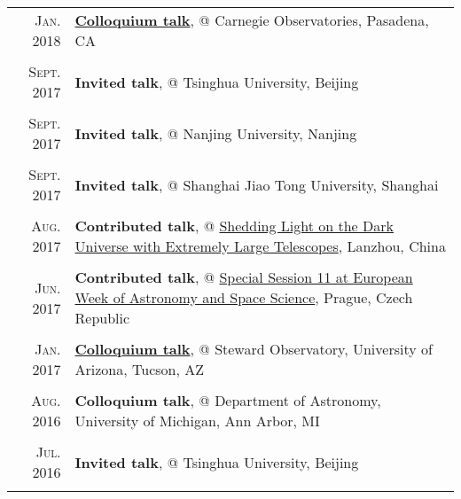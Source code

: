 \documentclass[letterpaper,10pt]{article}
\newcommand{\textwrap}{5.8in}       %
\begin{document}
\begin{longtable}{r|p{\textwrap}}
    \textsc{Jan. 2018}   &   \href{http://obs.carnegiescience.edu/talk_event/828}{\textbf{Colloquium talk}}, @ Carnegie Observatories, Pasadena, CA \\
    \multicolumn{2}{c}{} \\

    \textsc{Sept. 2017}   &   \textbf{Invited talk}, @ Tsinghua University, Beijing \\
    \multicolumn{2}{c}{} \\

    \textsc{Sept. 2017}   &   \textbf{Invited talk}, @ Nanjing University, Nanjing \\
    \multicolumn{2}{c}{} \\

    \textsc{Sept. 2017}   &   \textbf{Invited talk}, @ Shanghai Jiao Tong University, Shanghai \\
    \multicolumn{2}{c}{} \\

    \textsc{Aug. 2017}   &   \textbf{Contributed talk}, @
    \href{http://darkuniverse2017.csp.escience.cn/dct/page/65580}{Shedding Light on
    the Dark Universe with Extremely Large Telescopes}, Lanzhou, China      \\
    \multicolumn{2}{c}{} \\

    \textsc{Jun. 2017}   &   \textbf{Contributed talk}, @
    \href{http://eas.unige.ch/EWASS2017/session.jsp?id=SS11}{Special Session 11 at
    European Week of Astronomy and Space Science}, Prague, Czech Republic   \\
    \multicolumn{2}{c}{} \\

    \textsc{Jan. 2017}   &   \href{http://mingus.as.arizona.edu/~bjw/galaxy_group/2017spring.html}{\textbf{Colloquium talk}}, @ Steward Observatory, University of Arizona, Tucson, AZ \\
    \multicolumn{2}{c}{} \\

    \textsc{Aug. 2016}   &   \textbf{Colloquium talk}, @ Department of Astronomy, University of Michigan, Ann Arbor, MI \\
    \multicolumn{2}{c}{} \\

    \textsc{Jul. 2016}   &   \textbf{Invited talk}, @ Tsinghua University, Beijing \\
    \multicolumn{2}{c}{} \\



\end{longtable}
\end{document}
